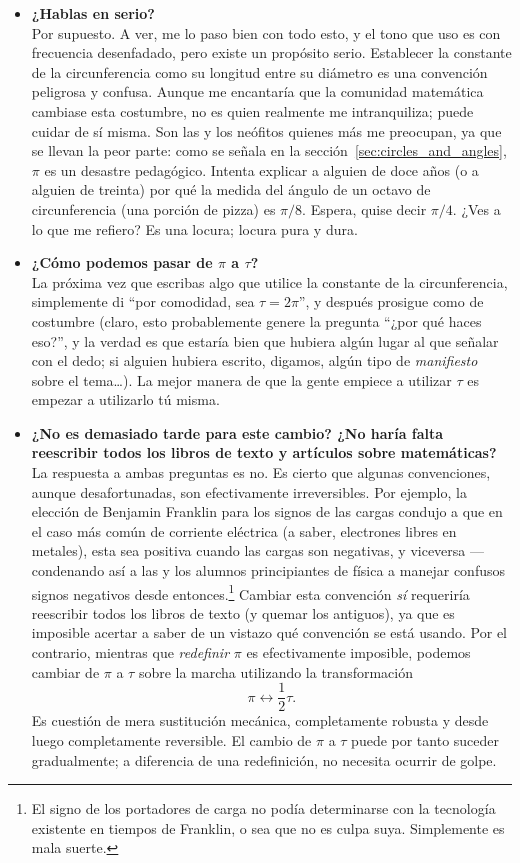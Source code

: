 \begin{itemize}

  \item \textbf{¿Hablas en serio?} \\ Por supuesto. A ver, me lo paso bien con todo esto, y el tono que uso es con frecuencia desenfadado, pero existe un propósito serio. Establecer la constante de la circunferencia como su longitud entre su diámetro es una convención peligrosa y confusa. Aunque me encantaría que la comunidad matemática cambiase esta costumbre, no es quien realmente me intranquiliza; puede cuidar de sí misma. Son las y los neófitos quienes más me preocupan, ya que se llevan la peor parte: como se señala en la sección~\ref{sec:circles_and_angles}, $\pi$ es un desastre pedagógico. Intenta explicar a alguien de doce años (o a alguien de treinta) por qué la medida del ángulo de un octavo de circunferencia (una porción de pizza) es $\pi/8$. Espera, quise decir $\pi/4$. ¿Ves a lo que me refiero? Es una locura; locura pura y dura.

  \item \textbf{¿Cómo podemos pasar de $\pi$ a $\tau$?} \\ La próxima vez que escribas algo que utilice la constante de la circunferencia, simplemente di ``por comodidad, sea $\tau = 2\pi$'', y después prosigue como de costumbre (claro, esto probablemente genere la pregunta ``¿por qué haces eso?'', y la verdad es que estaría bien que hubiera algún lugar al que señalar con el dedo; si alguien hubiera escrito, digamos, algún tipo de \emph{manifiesto} sobre el tema\ldots). La mejor manera de que la gente empiece a utilizar $\tau$ es empezar a utilizarlo tú misma.

  \item \textbf{¿No es demasiado tarde para este cambio? ¿No haría falta reescribir todos los libros de texto y artículos sobre matemáticas?} \\ La respuesta a ambas preguntas es no. Es cierto que algunas convenciones, aunque desafortunadas, son efectivamente irreversibles. Por ejemplo, la elección de Benjamin Franklin para los signos de las cargas condujo a que en el caso más común de corriente eléctrica (a saber, electrones libres en metales), esta sea positiva cuando las cargas son negativas, y viceversa ---condenando así a las y los alumnos principiantes de física a manejar confusos signos negativos desde entonces.\footnote{El signo de los portadores de carga no podía determinarse con la tecnología existente en tiempos de Franklin, o sea que no es culpa suya. Simplemente es mala suerte.} Cambiar esta convención \emph{sí} requeriría reescribir todos los libros de texto (y quemar los antiguos), ya que es imposible acertar a saber de un vistazo qué convención se está usando. Por el contrario, mientras que \emph{redefinir} $\pi$ es efectivamente imposible, podemos cambiar de $\pi$ a $\tau$ sobre la marcha utilizando la transformación \[ \pi \leftrightarrow \textstyle{\frac{1}{2}}\tau. \] Es cuestión de mera sustitución mecánica, completamente robusta y desde luego completamente reversible. El cambio de  $\pi$ a $\tau$ puede por tanto suceder gradualmente; a diferencia de una redefinición, no necesita ocurrir de golpe.


\end{itemize}
